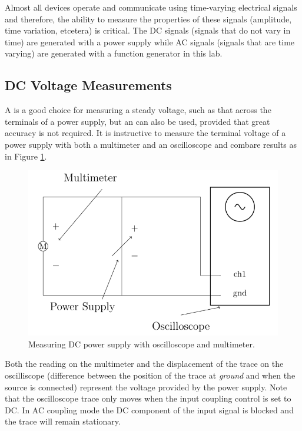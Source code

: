 \documentclass[12pt, a4paper, oneside, openright, titlepage]{book}
\begin{document}
Almost all devices operate and communicate using time-varying electrical signals and therefore, the ability to measure the properties of these signals (amplitude, time variation, etcetera) is critical. The DC signals (signals that do not vary in time) are generated with a power supply while AC signals (signals that are time varying) are generated with a function generator in this lab. 

\subsection{DC Voltage Measurements}

A  is a good choice for measuring a steady voltage, such as that across the terminals of a power supply, but an  can also be used, provided that great accuracy is not required. It is instructive to measure the terminal voltage of a power supply with both a multimeter and an oscilloscope and combare results as in Figure \ref{fig:ACDC2}.

\begin{figure}[H]
    \centering
    \includegraphics[scale = 0.8]{Images/ACDC1.PNG}
    \caption{Measuring DC power supply with oscilloscope and multimeter.}
    \label{fig:ACDC2}
\end{figure}

Both the reading on the multimeter and the displacement of the trace on the oscilliscope (difference between the position of the trace at \emph{ground} and when the source is connected) represent the voltage provided by the power supply. Note that the oscilloscope trace only moves when the input coupling control is set to DC. In AC coupling mode the DC component of the input signal is blocked and the trace will remain stationary. 
\end{document}
